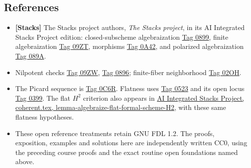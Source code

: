 \documentclass[11pt]{article}
\providecommand{\tightlist}{\setlength{\itemsep}{0pt}\setlength{\parskip}{0pt}}
\begin{document}
\subsection{References}\label{references}

\begin{itemize}
\tightlist
\item
  \textbf{{[}Stacks{]}} The Stacks project authors, \emph{The Stacks
  project}, in its AI Integrated Stacks Project edition:
  closed-subscheme algebraization
  \href{https://kokunoyumeto.github.io/stacks-zh-hans-cn/en/coherent.html\#coherent-lemma-algebraize-formal-closed-subscheme}{Tag
  0899}, finite algebraization
  \href{https://kokunoyumeto.github.io/stacks-zh-hans-cn/en/coherent.html\#coherent-lemma-algebraize-formal-scheme-finite-over-proper}{Tag
  09ZT}, morphisms
  \href{https://kokunoyumeto.github.io/stacks-zh-hans-cn/en/coherent.html\#coherent-lemma-algebraize-morphism}{Tag
  0A42}, and polarized algebraization
  \href{https://kokunoyumeto.github.io/stacks-zh-hans-cn/en/coherent.html\#coherent-theorem-algebraization}{Tag
  089A}.
\item
  Nilpotent checks
  \href{https://kokunoyumeto.github.io/stacks-zh-hans-cn/en/more-morphisms.html\#more-morphisms-lemma-thicken-property-morphisms-cartesian}{Tag
  09ZW},
  \href{https://kokunoyumeto.github.io/stacks-zh-hans-cn/en/morphisms.html\#morphisms-lemma-check-closed-infinitesimally}{Tag
  0896}; finite-fiber neighborhood
  \href{https://kokunoyumeto.github.io/stacks-zh-hans-cn/en/coherent.html\#coherent-lemma-proper-finite-fibre-finite-in-neighbourhood}{Tag
  02OH}.
\item
  The Picard sequence is
  \href{https://kokunoyumeto.github.io/stacks-zh-hans-cn/en/more-morphisms.html\#more-morphisms-lemma-picard-group-first-order-thickening}{Tag
  0C6R}. Flatness uses
  \href{https://kokunoyumeto.github.io/stacks-zh-hans-cn/en/algebra.html\#algebra-lemma-flat-module-powers}{Tag
  0523} and its open locus
  \href{https://kokunoyumeto.github.io/stacks-zh-hans-cn/en/more-morphisms.html\#more-morphisms-theorem-openness-flatness}{Tag
  0399}. The flat \(H^2\) criterion also appears in
  \href{https://kokunoyumeto.github.io/stacks-zh-hans-cn/en/coherent.html\#coherent-lemma-algebraize-flat-formal-scheme-H2}{AI
  Integrated Stacks Project, coherent.tex,
  lemma-algebraize-flat-formal-scheme-H2}, with these same flatness
  hypotheses.
\item
  These open reference treatments retain GNU FDL 1.2. The proofs,
  exposition, examples and solutions here are independently written CC0,
  using the preceding course proofs and the exact routine open
  foundations named above.
\end{itemize}
\end{document}
